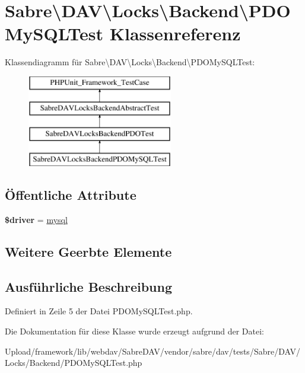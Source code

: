 \hypertarget{class_sabre_1_1_d_a_v_1_1_locks_1_1_backend_1_1_p_d_o_my_s_q_l_test}{}\section{Sabre\textbackslash{}D\+AV\textbackslash{}Locks\textbackslash{}Backend\textbackslash{}P\+D\+O\+My\+S\+Q\+L\+Test Klassenreferenz}
\label{class_sabre_1_1_d_a_v_1_1_locks_1_1_backend_1_1_p_d_o_my_s_q_l_test}
Klassendiagramm für Sabre\textbackslash{}D\+AV\textbackslash{}Locks\textbackslash{}Backend\textbackslash{}P\+D\+O\+My\+S\+Q\+L\+Test\+:\begin{figure}[H]
\begin{center}
\leavevmode
\includegraphics[height=4.000000cm]{class_sabre_1_1_d_a_v_1_1_locks_1_1_backend_1_1_p_d_o_my_s_q_l_test}
\end{center}
\end{figure}
\subsection*{Öffentliche Attribute}
\begin{DoxyCompactItemize}
\item 
\mbox{\label{class_sabre_1_1_d_a_v_1_1_locks_1_1_backend_1_1_p_d_o_my_s_q_l_test_a06fc479e29a11efa96af4ba8724511a5}} 
{\bfseries \$driver} = \textquotesingle{}\mbox{\hyperlink{classmysql}{mysql}}\textquotesingle{}
\end{DoxyCompactItemize}
\subsection*{Weitere Geerbte Elemente}


\subsection{Ausführliche Beschreibung}


Definiert in Zeile 5 der Datei P\+D\+O\+My\+S\+Q\+L\+Test.\+php.



Die Dokumentation für diese Klasse wurde erzeugt aufgrund der Datei\+:\begin{DoxyCompactItemize}
\item 
Upload/framework/lib/webdav/\+Sabre\+D\+A\+V/vendor/sabre/dav/tests/\+Sabre/\+D\+A\+V/\+Locks/\+Backend/P\+D\+O\+My\+S\+Q\+L\+Test.\+php\end{DoxyCompactItemize}

